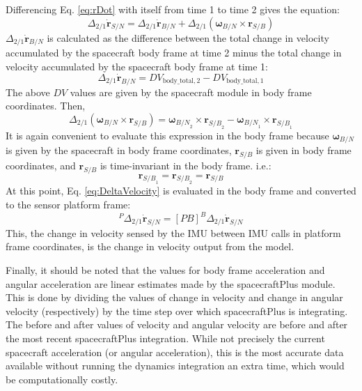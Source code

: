 Differencing Eq. \ref{eq:rDot} with itself from time 1 to time 2 gives the equation:
\begin{equation}
	\Delta_{2/1} 	\dot{\bm{r}}_{S/N} = \Delta_{2/1} \dot{\bm{r}}_{B/N} + \Delta_{2/1} (\bm{\omega}_{B/N} \times \bm{r}_{S/B})
	\label{eq:DeltaVelocity}
\end{equation}
$\Delta_{2/1} \dot{\bm{r}}_{B/N}$ is calculated as the difference between the total change in velocity accumulated by the spacecraft body frame at time 2 minus the total change in velocity accumulated by the spacecraft body frame at time 1:
\begin{equation}
\Delta_{2/1} \dot{\bm{r}}_{B/N} = DV_{\textrm{body\_total},2} - DV_{\textrm{body\_total},1}
\end{equation}
The above $DV$ values are given by the spacecraft module in body frame coordinates. Then,
\begin{equation}
	\Delta_{2/1} (\bm{\omega}_{B/N} \times \bm{r}_{S/B}) = \bm{\omega}_{{B/N}_2} \times \bm{r}_{{S/B}_2} - \bm{\omega}_{{B/N}_1} \times \bm{r}_{{S/B}_1}
\end{equation}
It is again convenient to evaluate this expression in the body frame because $\bm{\omega}_{{B/N}}$ is given by the spacecraft in body frame coordinates, $\bm{r}_{S/B}$ is given in body frame coordinates, and $\bm{r}_{S/B}$ is time-invariant in the body frame. i.e.:
\begin{equation}
	\bm{r}_{{S/B}_1} = \bm{r}_{{S/B}_2} = \bm{r}_{S/B}
\end{equation}
At this point, Eq. \ref{eq:DeltaVelocity} is evaluated in the body frame and converted to the sensor platform frame:
\begin{equation}
^P \Delta_{2/1} 	\dot{\bm{r}}_{S/N} = [PB] ^B \Delta_{2/1} 	\dot{\bm{r}}_{S/N}
\end{equation}
This, the change in velocity sensed by the IMU between IMU calls in platform frame coordinates, is the change in velocity output from the model.

Finally, it should be noted that the values for body frame acceleration and angular acceleration are linear estimates made by the spacecraftPlus module. This is done by dividing the values of change in velocity and change in angular velocity (respectively) by the time step over which spacecraftPlus is integrating. The before and after values of velocity and angular velocity are before and after the most recent spacecraftPlus integration. While not precisely the current spacecraft acceleration (or angular acceleration), this is the most accurate data available without running the dynamics integration an extra time, which would be computationally costly.

